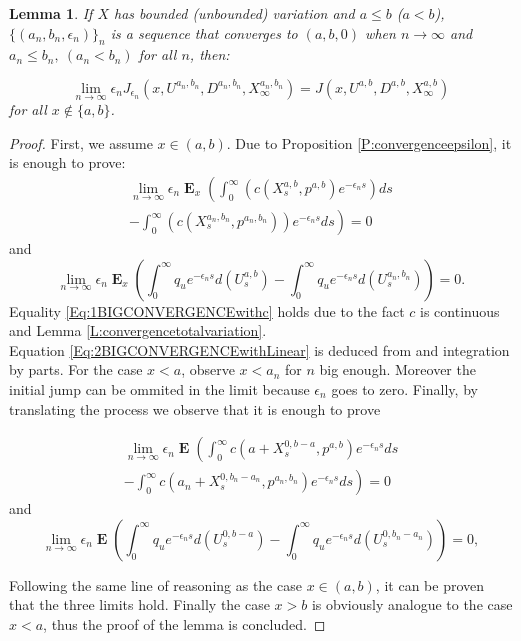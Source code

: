 \documentclass{article}
\newtheorem{lemma}[thm]{Lemma}
\newcommand\E{\operatorname{\mathbf{E}}}
\begin{document}
%
\begin{lemma}\label{L:continuitypowerful}
If $X$ has bounded (unbounded) variation and $a \leq b$ ($a <b$), $\lbrace (a_n, b_n,\epsilon_n) \rbrace_n$ is a sequence that converges to $(a,b,0)$ when $n \to \infty$ and $a_n \leq b_n, \ (a_n<b_n)$ for all $n$,  then:

$$\lim_{n \to \infty}\epsilon_n J_{\epsilon_n}(x,U^{a_n,b_n},D^{a_n,b_n},X^{a_n,b_n}_{\infty})=J(x,U^{a,b},D^{a,b},X^{a,b}_{\infty}) $$
for all $x \notin \lbrace a,b \rbrace $.
\end{lemma}
\begin{proof}
First, we assume $x \in ( a,b) $. Due to Proposition \ref{P:convergenceepsilon}, it is enough to prove:
\begin{multline}\label{Eq:1BIGCONVERGENCEwithc}
\lim_{n \to \infty}\epsilon_n \E_x \left( \int_0^{\infty}\left(c(X^{a,b}_s,p^{a,b})e^{-\epsilon_n s} \right)ds \right. \\ \left. -  \int_0^{\infty}\left(c(X^{a_n,b_n}_s,p^{a_n,b_n}) \right)e^{-\epsilon_n s}ds\right)=0 
\end{multline}
 and \begin{equation}\label{Eq:2BIGCONVERGENCEwithLinear}
\lim_{n \to \infty}\epsilon_n \E_x \left(\int_{0}^{\infty}q_u e^{-\epsilon_n s} d(U^{a,b}_s)  -\int_{0}^{\infty}q_u e^{-\epsilon_n s} d(U^{a_n,b_n}_s) \right)=0. 
\end{equation}
%
Equality \eqref{Eq:1BIGCONVERGENCEwithc} holds due to the fact $c$ is continuous and Lemma \ref{L:convergencetotalvariation}. \\
Equation \eqref{Eq:2BIGCONVERGENCEwithLinear} is deduced from \cite[Proposition 10]{MO} and integration by parts. 
%
For the case $x<a$, observe $x< a_n$ for $n$ big enough. Moreover the initial jump can be ommited in the limit because $\epsilon_n$ goes to zero. Finally, by translating the process we observe that it is enough to prove

\begin{multline*}
\lim_{n \to \infty}\epsilon_n \E \left( \int_0^{\infty}c(a+X^{0,b-a}_s,p^{a,b})e^{-\epsilon_n s} ds\right. \\ \left. - \int_0^{\infty}c(a_n+X^{0,b_n-a_n}_s,p^{a_n,b_n}) e^{-\epsilon_n s}ds\right)=0
\end{multline*}
and
 \begin{equation*}
\lim_{n \to \infty}\epsilon_n \E \left(\int_{0}^{\infty} q_u e^{-\epsilon_n s} d(U^{0,b-a}_s)  -\int_{0}^{\infty}q_u e^{-\epsilon_n s} d(U^{0,b_n-a_n}_s) \right)=0, 
\end{equation*}



Following the same line of reasoning as the case $x\in (a,b)$, it can be proven that the three limits hold. Finally the case $x>b$ is obviously analogue to the case $x<a$, thus the proof of the lemma is concluded.

\end{proof}
%
\end{document}
